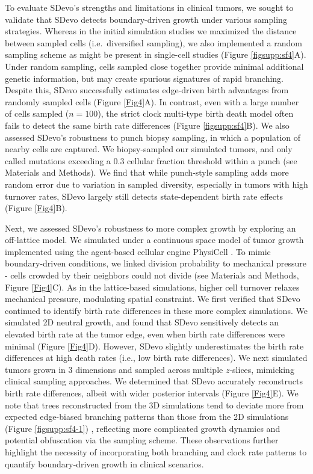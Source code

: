 \documentclass[12pt]{elife_based}
\begin{document}
To evaluate SDevo's strengths and limitations in clinical tumors, we sought to validate that SDevo detects boundary-driven growth under various sampling strategies. Whereas in the initial simulation studies we maximized the distance between sampled cells (i.e.\ diversified sampling), we also implemented a random sampling scheme as might be present in single-cell studies (Figure \ref{figsupp:sf4}A). Under random sampling, cells sampled close together provide minimal additional genetic information, but may create spurious signatures of rapid branching. Despite this, SDevo successfully estimates edge-driven birth advantages from randomly sampled cells (Figure \ref{Fig4}A). In contrast, even with a large number of cells sampled ($n=100$), the strict clock multi-type birth death model often fails to detect the same birth rate differences (Figure \ref{figsupp:sf4}B). We also assessed SDevo's robustness to punch biopsy sampling, in which a population of nearby cells are captured. We biopsy-sampled our simulated tumors, and only called mutations exceeding a 0.3 cellular fraction threshold within a punch (see Materials and Methods). We find that while punch-style sampling adds more random error due to variation in sampled diversity, especially in tumors with high turnover rates, SDevo largely still detects state-dependent birth rate effects (Figure \ref{Fig4}B).

Next, we assessed SDevo's robustness to more complex growth by exploring an off-lattice model. We simulated under a continuous space model of tumor growth implemented using the agent-based cellular engine PhysiCell \citep{ghaffarizadeh2018physicell}. To mimic boundary-driven conditions, we linked division probability to mechanical pressure - cells crowded by their neighbors could not divide (see Materials and Methods, Figure \ref{Fig4}C). As in the lattice-based simulations, higher cell turnover relaxes mechanical pressure, modulating spatial constraint. We first verified that SDevo continued to identify birth rate differences in these more complex simulations. We simulated 2D neutral growth, and found that SDevo sensitively detects an elevated birth rate at the tumor edge, even when birth rate differences were minimal (Figure \ref{Fig4}D). However, SDevo slightly underestimates the birth rate differences at high death rates (i.e., low birth rate differences). We next simulated tumors grown in 3 dimensions and sampled across multiple $z$-slices, mimicking clinical sampling approaches. We determined that SDevo accurately reconstructs birth rate differences, albeit with wider posterior intervals (Figure \ref{Fig4}E). We note that trees reconstructed from the 3D simulations tend to deviate more from expected edge-biased branching patterns than those from the 2D simulations (Figure \ref{figsupp:sf4-1}) , reflecting more complicated growth dynamics and potential obfuscation via the sampling scheme. These observations further highlight the necessity of incorporating both branching and clock rate patterns to quantify boundary-driven growth in clinical scenarios. 
\end{document}
